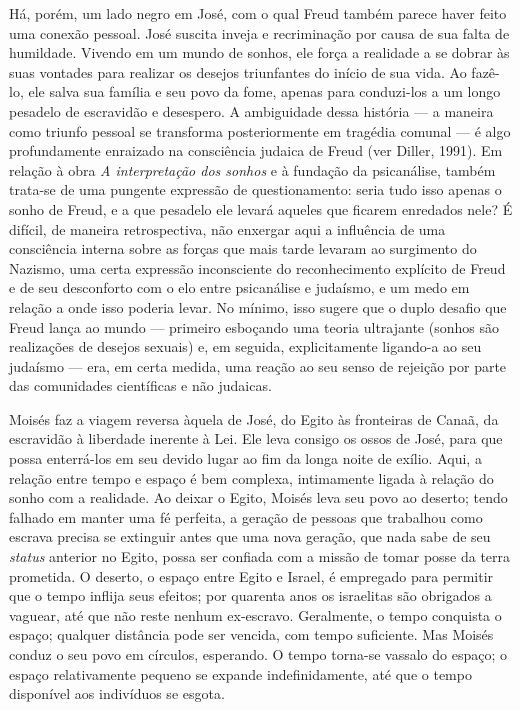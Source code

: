 Há, porém, um lado negro em José, com o qual Freud também parece haver
feito uma conexão pessoal. José suscita inveja e recriminação por causa
de sua falta de humildade. Vivendo em um mundo de sonhos, ele força a
realidade a se dobrar às suas vontades para realizar os desejos
triunfantes do início de sua vida. Ao fazê-lo, ele salva sua família e
seu povo da fome, apenas para conduzi-los a um longo pesadelo de
escravidão e desespero. A ambiguidade dessa história --- a maneira como
triunfo pessoal se transforma posteriormente em tragédia comunal --- é
algo profundamente enraizado na consciência judaica de Freud (ver
Diller, 1991). Em relação à obra \emph{A interpretação dos sonhos} e à
fundação da psicanálise, também trata-se de uma pungente expressão de
questionamento: seria tudo isso apenas o sonho de Freud, e a que
pesadelo ele levará aqueles que ficarem enredados nele? É difícil, de
maneira retrospectiva, não enxergar aqui a influência de uma consciência
interna sobre as forças que mais tarde levaram ao surgimento do Nazismo,
uma certa expressão inconsciente do reconhecimento explícito de Freud e
de seu desconforto com o elo entre psicanálise e judaísmo, e um medo em
relação a onde isso poderia levar. No mínimo, isso sugere que o duplo
desafio que Freud lança ao mundo --- primeiro esboçando uma teoria
ultrajante (sonhos são realizações de desejos sexuais) e, em seguida,
explicitamente ligando-a ao seu judaísmo --- era, em certa medida, uma
reação ao seu senso de rejeição por parte das comunidades científicas e
não judaicas.

Moisés faz a viagem reversa àquela de José, do Egito às fronteiras de
Canaã, da escravidão à liberdade inerente à Lei. Ele leva consigo os
ossos de José, para que possa enterrá-los em seu devido lugar ao fim da
longa noite de exílio. Aqui, a relação entre tempo e espaço é bem
complexa, intimamente ligada à relação do sonho com a realidade. Ao
deixar o Egito, Moisés leva seu povo ao deserto; tendo falhado em manter
uma fé perfeita, a geração de pessoas que trabalhou como escrava precisa
se extinguir antes que uma nova geração, que nada sabe de seu
\emph{status} anterior no Egito, possa ser confiada com a missão de
tomar posse da terra prometida. O deserto, o espaço entre Egito e
Israel, é empregado para permitir que o tempo inflija seus efeitos; por
quarenta anos os israelitas são obrigados a vaguear, até que não reste
nenhum ex-escravo. Geralmente, o tempo conquista o espaço; qualquer
distância pode ser vencida, com tempo suficiente. Mas Moisés conduz o
seu povo em círculos, esperando. O tempo torna-se vassalo do espaço; o
espaço relativamente pequeno se expande indefinidamente, até que o tempo
disponível aos indivíduos se esgota.

